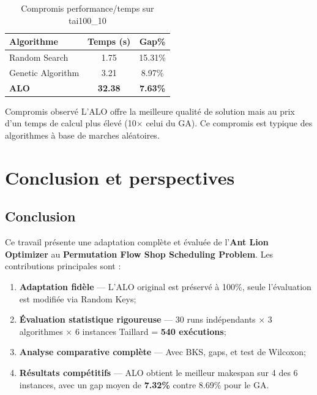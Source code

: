 \documentclass[12pt,a4paper,twoside]{report}
\begin{document}
\begin{table}[H]
\centering
{}
\caption{Compromis performance/temps sur tai100\_10}
\label{tab:compromis}
\begin{tabular}{lcc}
\toprule
\rowcolor{TableHeader}
\color{white}Algorithme & \color{white}Temps (s) & \color{white}Gap\% \\
\midrule
Random Search    & 1.75  & 15.31\% \\
Genetic Algorithm & 3.21  & 8.97\% \\
\textbf{ALO} & \textbf{32.38} & \textbf{7.63\%} \\
\bottomrule
\end{tabular}
\end{table}

\begin{resultbox}{Compromis observé}
L'ALO offre la meilleure qualité de solution mais au prix d'un temps de calcul plus élevé (10$\times$ celui du GA). Ce compromis est typique des algorithmes à base de marches aléatoires.
\end{resultbox}

\chapter{Conclusion et perspectives}

\section{Conclusion}

Ce travail présente une adaptation complète et évaluée de l'\textbf{Ant Lion Optimizer} au \textbf{Permutation Flow Shop Scheduling Problem}. Les contributions principales sont :

\begin{enumerate}
    \item \textbf{Adaptation fidèle} --- L'ALO original est préservé à 100\%, seule l'évaluation est modifiée via Random Keys;
    \item \textbf{Évaluation statistique rigoureuse} --- 30 runs indépendants $\times$ 3 algorithmes $\times$ 6 instances Taillard = \textbf{540 exécutions};
    \item \textbf{Analyse comparative complète} --- Avec BKS, gaps, et test de Wilcoxon;
    \item \textbf{Résultats compétitifs} --- ALO obtient le meilleur makespan sur 4 des 6 instances, avec un gap moyen de \textbf{7.32\%} contre 8.69\% pour le GA.
\end{enumerate}
\end{document}
